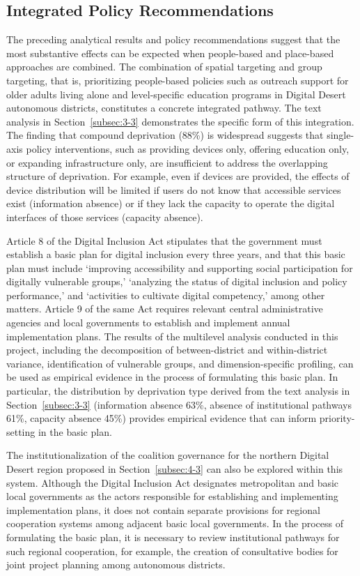 \subsection{Integrated Policy Recommendations}
\label{subsec:4-4}

The preceding analytical results and policy recommendations suggest that the most substantive effects can be expected when people-based and place-based approaches are combined. The combination of spatial targeting and group targeting, that is, prioritizing people-based policies such as outreach support for older adults living alone and level-specific education programs in Digital Desert autonomous districts, constitutes a concrete integrated pathway. The text analysis in Section~\ref{subsec:3-3} demonstrates the specific form of this integration. The finding that compound deprivation (88\%) is widespread suggests that single-axis policy interventions, such as providing devices only, offering education only, or expanding infrastructure only, are insufficient to address the overlapping structure of deprivation. For example, even if devices are provided, the effects of device distribution will be limited if users do not know that accessible services exist (information absence) or if they lack the capacity to operate the digital interfaces of those services (capacity absence).

Article 8 of the Digital Inclusion Act stipulates that the government must establish a basic plan for digital inclusion every three years, and that this basic plan must include `improving accessibility and supporting social participation for digitally vulnerable groups,' `analyzing the status of digital inclusion and policy performance,' and `activities to cultivate digital competency,' among other matters. Article 9 of the same Act requires relevant central administrative agencies and local governments to establish and implement annual implementation plans. The results of the multilevel analysis conducted in this project, including the decomposition of between-district and within-district variance, identification of vulnerable groups, and dimension-specific profiling, can be used as empirical evidence in the process of formulating this basic plan. In particular, the distribution by deprivation type derived from the text analysis in Section~\ref{subsec:3-3} (information absence 63\%, absence of institutional pathways 61\%, capacity absence 45\%) provides empirical evidence that can inform priority-setting in the basic plan.

The institutionalization of the coalition governance for the northern Digital Desert region proposed in Section~\ref{subsec:4-3} can also be explored within this system. Although the Digital Inclusion Act designates metropolitan and basic local governments as the actors responsible for establishing and implementing implementation plans, it does not contain separate provisions for regional cooperation systems among adjacent basic local governments. In the process of formulating the basic plan, it is necessary to review institutional pathways for such regional cooperation, for example, the creation of consultative bodies for joint project planning among autonomous districts.

